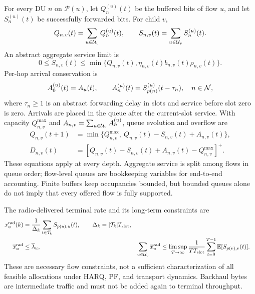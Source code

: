 \begin{EnChapter}
For every DU $n$ on $\mathcal{P}(u)$, let $Q_n^{(u)}(t)$ be the buffered bits of
flow $u$, and let $S_n^{(u)}(t)$ be successfully forwarded bits. For child $v$,
\begin{equation}
  Q_{n,v}(t)=\sum_{u\in\mathcal{U}_v}Q_n^{(u)}(t),\qquad
  S_{n,v}(t)=\sum_{u\in\mathcal{U}_v}S_n^{(u)}(t).
\end{equation}
An abstract aggregate service limit is
\begin{equation}
  0\le S_{n,v}(t)\le
  \min\{Q_{n,v}(t),\eta_{n,v}(t)b_{n,v}(t)\rho_{n,v}(t)\}.
  \label{eq:queue-agg}
\end{equation}
Per-hop arrival conservation is
\begin{equation}
  A_0^{(u)}(t)=A_u(t),\qquad
  A_n^{(u)}(t)=S_{p(n)}^{(u)}(t-\tau_n),\quad n\in\mathcal{N},
  \label{eq:flow-conservation}
\end{equation}
where $\tau_n\ge1$ is an abstract forwarding delay in slots and service before
slot zero is zero. Arrivals are placed in the queue after the current-slot
service. With capacity $Q_{n,v}^{\max}$ and
$A_{n,v}=\sum_{u\in\mathcal{U}_v}A_n^{(u)}$, queue evolution and overflow are
\begin{align}
  Q_{n,v}(t+1)&=\min\{Q_{n,v}^{\max},\ Q_{n,v}(t)-S_{n,v}(t)+A_{n,v}(t)\},
  \label{eq:queue}\\
  D_{n,v}(t)&=[Q_{n,v}(t)-S_{n,v}(t)+A_{n,v}(t)-Q_{n,v}^{\max}]^+.
  \label{eq:drop}
\end{align}
These equations apply at every depth. Aggregate service is split among flows in
queue order; flow-level queues are bookkeeping variables for end-to-end accounting.
Finite buffers keep occupancies bounded, but bounded queues alone do not imply
that every offered flow is fully supported.

The radio-delivered terminal rate and its long-term constraints are
\begin{align}
  x_u^{\mathrm{rad}}(k)&=\frac{1}{\Delta_k}
                  \sum_{t\in\mathcal{T}_k}S_{p(u),u}(t),
                  \qquad \Delta_k=|\mathcal{T}_k|T_{\mathrm{slot}},
  \label{eq:ue-tput}\\
  \overline x_u^{\mathrm{rad}}&\le\overline\lambda_u, &
  \sum_{u\in\mathcal{U}_v}\overline x_u^{\mathrm{rad}}
      &\le\limsup_{T\to\infty}\frac{1}{TT_{\mathrm{slot}}}
                \sum_{t=0}^{T-1}\mathbb{E}[S_{p(v),v}(t)].
  \label{eq:link-cap}
\end{align}
These are necessary flow constraints, not a sufficient characterization of all
feasible allocations under HARQ, PF, and transport dynamics. Backhaul bytes are
intermediate traffic and must not be added again to terminal throughput.


\end{EnChapter}
